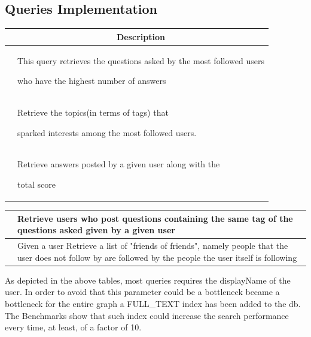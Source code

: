 \documentclass[11pt]{report}
\begin{document}
    \newpage
    \subsection{Queries Implementation}
    \begin{table}[H]
        \centering
        \begin{tabular}{|m{13cm}|m{5cm}|} 
        \hline
        \rowcolor[rgb]{0.937,0.937,0.937} \multicolumn{1}{|c|}{\textbf{Query}} & \multicolumn{1}{c|}{\textbf{Description}} \\ 
        \hline
         & This query retrieves the questions asked by the most followed users \par who have the highest number of answers \\ 
        \hline
          & Retrieve the topics(in terms of tags) that \par sparked interests among the most followed users.    \\ 
        \hline
          & Retrieve answers posted by a given user along with the \par total score  \\ 
        \hline
       
        \end{tabular}
    \end{table}
    
\newpage

\begin{table}
    \centering
    \begin{tabular}{|m{13cm}|m{5cm}|} 
    \hline
     & Retrieve users who post questions containing the same tag of the questions asked given by a given user   \\
    \hline
     & Given a user Retrieve a list of "friends of friends", namely people that the user does not follow by are followed by the people the user itself is following   \\
    \hline
    \end{tabular}
\end{table}
As depicted in the above tables, most queries requires the displayName of the user. In order to avoid that this parameter could be a bottleneck became a bottleneck for the entire graph a FULL\_TEXT index has been added to the db. The Benchmarks show that such index could increase the search performance every time, at least, of a factor of 10.
\newpage
\end{document}
